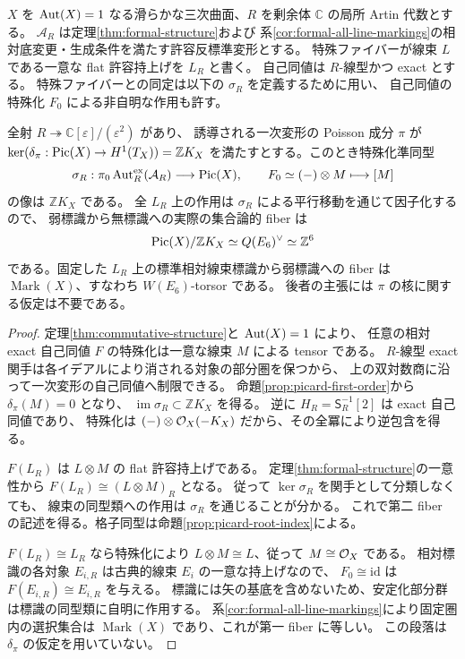 \begin{theorem}\label{thm:artin-actual-fibers}
$X$ を $\operatorname{Aut}(X)=1$ なる滑らかな三次曲面、$R$ を剰余体 $\mathbb C$ の局所 Artin 代数とする。
$\mathcal A_R$ は定理\ref{thm:formal-structure}および
系\ref{cor:formal-all-line-markings}の相対底変更・生成条件を満たす許容反標準変形とする。
特殊ファイバーが線束 $L$ である一意な flat 許容持上げを $L_R$ と書く。
自己同値は $R$-線型かつ exact とする。
特殊ファイバーとの同定は以下の $\sigma_R$ を定義するために用い、
自己同値の特殊化 $F_0$ による非自明な作用も許す。

全射 $R\twoheadrightarrow\mathbb C[\varepsilon]/(\varepsilon^2)$ があり、
誘導される一次変形の Poisson 成分 $\pi$ が
$\ker(\delta_\pi:\operatorname{Pic}(X)\to H^1(T_X))=\mathbb ZK_X$
を満たすとする。このとき特殊化準同型
\[
 \sigma_R:\pi_0\operatorname{Aut}^{\rm ex}_R(\mathcal A_R)\longrightarrow\operatorname{Pic}(X),
 \qquad F_0\simeq(-)\otimes M\longmapsto[M]
\]
の像は $\mathbb ZK_X$ である。
全 $L_R$ 上の作用は $\sigma_R$ による平行移動を通じて因子化するので、
弱標識から無標識への実際の集合論的 fiber は
\begin{equation}\label{eq:very-general-pointings}
 \operatorname{Pic}(X)/\mathbb ZK_X\simeq Q(E_6)^\vee\simeq\mathbb Z^6
\end{equation}
である。固定した $L_R$ 上の標準相対線束標識から弱標識への fiber は
$\operatorname{Mark}(X)$、すなわち $W(E_6)$-torsor である。
後者の主張には $\pi$ の核に関する仮定は不要である。
\end{theorem}
\begin{proof}
定理\ref{thm:commutative-structure}と $\operatorname{Aut}(X)=1$ により、
任意の相対 exact 自己同値 $F$ の特殊化は一意な線束 $M$ による tensor である。
$R$-線型 exact 関手は各イデアルにより消される対象の部分圏を保つから、
上の双対数商に沿って一次変形の自己同値へ制限できる。
命題\ref{prop:picard-first-order}から $\delta_\pi(M)=0$ となり、
$\operatorname{im}\sigma_R\subset\mathbb ZK_X$ を得る。
逆に $H_R=\mathsf S_R^{-1}[2]$ は exact 自己同値であり、
特殊化は $(-)\otimes\mathcal O_X(-K_X)$ だから、その全冪により逆包含を得る。

$F(L_R)$ は $L\otimes M$ の flat 許容持上げである。
定理\ref{thm:formal-structure}の一意性から
$F(L_R)\cong(L\otimes M)_R$ となる。
従って $\ker\sigma_R$ を関手として分類しなくても、
線束の同型類への作用は $\sigma_R$ を通じることが分かる。
これで第二 fiber の記述を得る。格子同型は命題\ref{prop:picard-root-index}による。

$F(L_R)\cong L_R$ なら特殊化により $L\otimes M\cong L$、従って $M\cong\mathcal O_X$ である。
相対標識の各対象 $E_{i,R}$ は古典的線束 $E_i$ の一意な持上げなので、
$F_0\cong\mathrm{id}$ は $F(E_{i,R})\cong E_{i,R}$ を与える。
標識には矢の基底を含めないため、安定化部分群は標識の同型類に自明に作用する。
系\ref{cor:formal-all-line-markings}により固定圏内の選択集合は
$\operatorname{Mark}(X)$ であり、これが第一 fiber に等しい。
この段落は $\delta_\pi$ の仮定を用いていない。
\end{proof}

